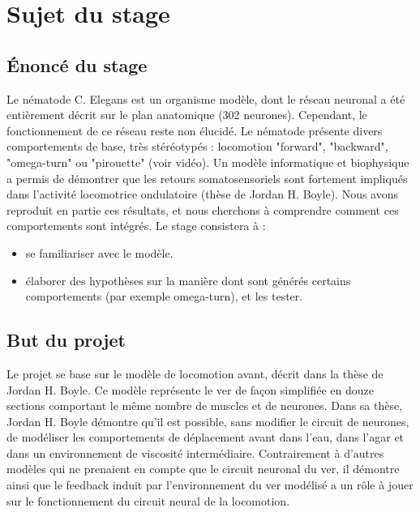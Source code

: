 \chapter{Sujet du stage} %
\label{cha:Sujet du stage}

\section{Énoncé du stage} %
\label{sec:Énoncé du stage}

Le nématode C. Elegans est un organisme modèle, dont le réseau neuronal a été entièrement décrit sur le plan
anatomique (302 neurones). Cependant, le fonctionnement de ce réseau reste non élucidé. Le nématode présente
divers comportements de base, très stéréotypés : locomotion "forward", "backward", "omega-turn" ou "pirouette"
(voir vidéo). Un modèle informatique et biophysique a permis de démontrer que les retours somatosensoriels
sont fortement impliqués dans l’activité locomotrice ondulatoire (thèse de Jordan H. Boyle). Nous avons
reproduit en partie ces résultats, et nous cherchons à comprendre comment ces comportements sont intégrés.
Le stage consistera à :
\begin{itemize}
   \item se familiariser avec le modèle.
   \item élaborer des hypothèses sur la manière dont sont générés certains comportements (par exemple
      omega-turn), et les tester.
\end{itemize}


\section{But du projet} %
\label{sec:But du projet}

Le projet se base sur le modèle de locomotion avant, décrit dans la thèse de Jordan H. Boyle\cite{Boyle2009}.
Ce modèle représente le ver de façon simplifiée en douze sections comportant le même nombre de muscles et de neurones.
Dans sa thèse, Jordan H. Boyle démontre qu'il est possible, sans modifier le circuit de neurones, de
modéliser les comportements de déplacement avant dans l'eau, dans l'agar et dans un environnement
de viscosité intermédiaire. Contrairement à d'autres modèles qui ne prenaient en compte que le circuit neuronal
du ver, il démontre ainsi que le feedback induit par l'environnement du ver modélisé a un rôle à jouer sur le
fonctionnement du circuit neural de la locomotion.

